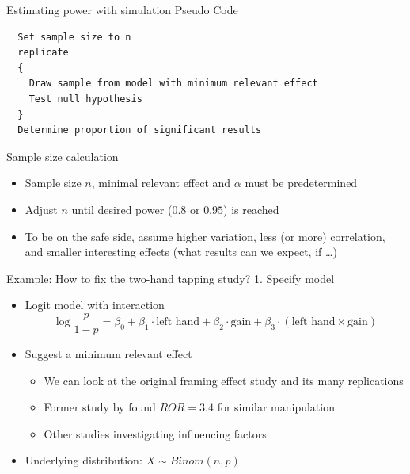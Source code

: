 \documentclass[aspectratio=169]{beamer}
\begin{document}
\begin{frame}[fragile]{Estimating power with simulation}
  {Pseudo Code}

\begin{lstlisting}
  Set sample size to n
  replicate
  {
    Draw sample from model with minimum relevant effect
    Test null hypothesis
  }
  Determine proportion of significant results
\end{lstlisting}

\vspace{2ex}

Sample size calculation\\[1ex]

\begin{itemize}
\item Sample size $n$, minimal relevant effect and $\alpha$ must be
predetermined

\item Adjust $n$ until desired power ($0.8$ or $0.95$) is reached

\item To be on the safe side, assume higher variation, less (or more)
correlation, and smaller interesting effects (what results can we expect, if
\dots)
\end{itemize}

\end{frame}

\begin{frame}{Example: How to fix the two-hand tapping study?}
  {1. Specify model}
  \begin{itemize}
    \item Logit model with interaction
  \[
  \log \frac{p}{1 - p} = \beta_0
                  + \beta_1 \cdot \text{left hand}
                  + \beta_2 \cdot \text{gain}
                  + \beta_3 \cdot (\text{left hand} \times \text{gain})
\]
    \item Suggest a minimum relevant effect
      \begin{itemize}
        \item We can look at the original framing effect study and its many replications
        \item Former study by \citet{McElroySeta03} found $ROR = 3.4$ for
          similar manipulation
        \item Other studies investigating influencing factors
        \citep[with RORs $\approx$ 2--3, e.\,g., foreign language
      effect,][]{CostaFoucart14, Wickelmaier15}
      \end{itemize}
    \item Underlying distribution: $X \sim Binom(n, p)$
  \end{itemize}
\end{frame}
\end{document}
